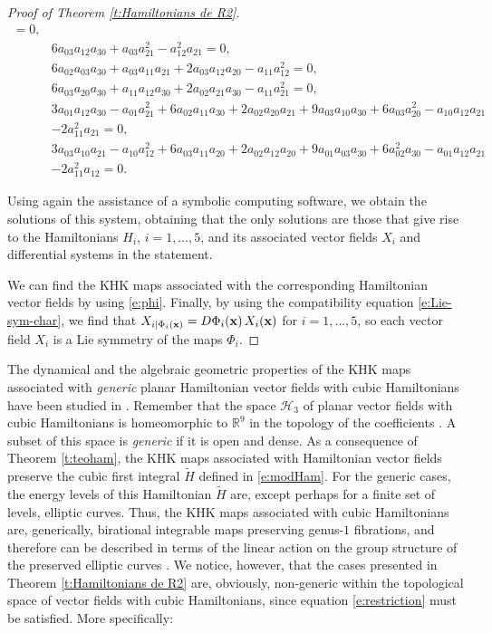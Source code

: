\documentclass[11pt]{article}
\begin{document}
\begin{proof}[Proof of Theorem \ref{t:Hamiltonians de R2}]
\begin{align*}
=0,\\ 
& 6 a_{03} a_{12} a_{30}+ a_{03} a_{21}^{2}- a_{12}^{2} a_{21}
=0,\\ 
& 6 a_{02} a_{03} a_{30}+ a_{03} a_{11} a_{21}+2 a_{03} a_{12} a_{20}- a_{11} a_{12}^{2}
=0,\\ 
& 6 a_{03} a_{20} a_{30}+ a_{11} a_{12} a_{30}+2 a_{02} a_{21} a_{30}- a_{11} a_{21}^{2}
=0,\\ 
& 3 a_{01} a_{12} a_{30}- a_{01} a_{21}^{2}+6 a_{02} a_{11} a_{30}+2 a_{02} a_{20} a_{21}+9 a_{03} a_{10} a_{30}+6 a_{03} a_{20}^{2}- a_{10} a_{12} a_{21}\\
&-2 a_{11}^{2} a_{21}
=0,\\
&3 a_{03} a_{10} a_{21}- a_{10} a_{12}^{2}+6 a_{03} a_{11} a_{20}
+2 a_{02} a_{12} a_{20}+ 9 a_{01} a_{03} a_{30}+6 a_{02}^{2} a_{30}- a_{01} a_{12} a_{21}\\
&-2 a_{11}^{2} a_{12}
=0.
\end{align*}




Using again the assistance of a symbolic computing software, we obtain the solutions of this system, obtaining that the only solutions are those that give rise to the Hamiltonians $H_i$, $i=1,\ldots,5$, and its associated vector fields $X_i$ and differential systems in the statement.


We can find the KHK maps associated with the corresponding Hamiltonian vector fields by using \eqref{e:phi}.  Finally, by using the compatibility equation \eqref{e:Lie-sym-char}, we find that $X_{i|\Phi_i(\bf{x})}=D\Phi_i({\bf{x}})\,X_i({\bf{x}})$ for $i=1,\ldots,5$, so each vector field $X_i$ is a Lie symmetry of the maps $\Phi_i$.


\end{proof}






The dynamical and the algebraic geometric properties of the KHK maps associated with \emph{generic} planar Hamiltonian vector fields with cubic Hamiltonians  have been studied in  \cite{Petrera19-1,Petrera19-2}. 
Remember that the space \(\mathcal{H}_3\) of planar vector fields with cubic Hamiltonians is homeomorphic to \(\mathbb{R}^9\) in the topology of the coefficients \cite[p. 202]{ADL}. A subset  of this space is \emph{generic} if it is open and dense. As a consequence of Theorem \ref{t:teoham}, the KHK maps associated with Hamiltonian vector fields preserve the cubic first integral $\tilde{H}$ defined in \eqref{e:modHam}. For the generic cases, the energy levels of this Hamiltonian $\tilde{H}$ are, except perhaps for a finite set of levels, elliptic curves. Thus, the KHK maps associated with cubic Hamiltonians are, generically, birational integrable maps preserving genus-$1$ fibrations, and therefore can be described in terms of the linear action on the group structure of the preserved elliptic curves \cite{D,JRV}.
We notice, however, that the cases presented in Theorem \ref{t:Hamiltonians de R2} are, obviously, non-generic within the topological space of vector fields with cubic Hamiltonians, since equation \eqref{e:restriction} must be satisfied. More specifically:
\end{document}
